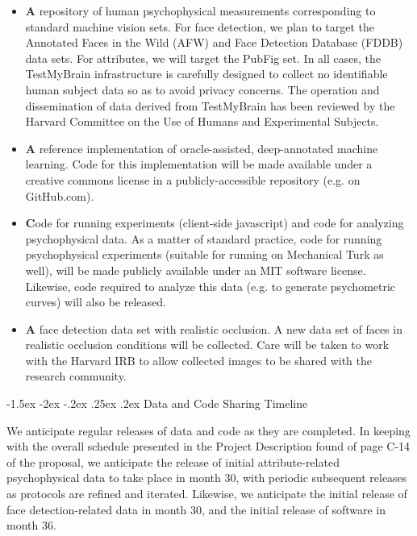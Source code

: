\documentclass{nsfproposal}
\makeatletter
\renewcommand\section{\@startsection {section}{1}{\z@}%
                                   {-1.5ex \@plus -2ex \@minus -.2ex}%
                                   {.25ex \@plus.2ex}%
                                   {\normalfont\Large\bfseries}}
\theoremstyle{definition}
\makeatother
\begin{document}
\begin{itemize}
\item {\textbf A repository of human psychophysical measurements corresponding to standard machine vision sets.}  For face detection, we plan to target the Annotated Faces in the Wild (AFW) and Face Detection Database (FDDB) data sets.  For attributes, we will target the PubFig set.  In all cases, the TestMyBrain infrastructure is carefully designed to collect no identifiable human subject data so as to avoid privacy concerns.  The operation and dissemination of data derived from TestMyBrain has been reviewed by the Harvard Committee on the Use of Humans and Experimental Subjects.

\item {\textbf A reference implementation of oracle-assisted, deep-annotated machine learning.}  Code for this implementation will be made available under a creative commons license in a publicly-accessible repository (e.g. on GitHub.com).

\item {\textbf Code for running experiments (client-side javascript) and code for analyzing psychophysical data.}  As a matter of standard practice, code for running psychophysical experiments (suitable for running on Mechanical Turk as well), will be made publicly available under an MIT software license.  Likewise, code required to analyze this data (e.g. to generate psychometric curves) will also be released.

\item {\textbf A face detection data set with realistic occlusion.}  A new data set of faces in realistic occlusion conditions will be collected.  Care will be taken to work with the Harvard IRB to allow collected images to be shared with the research community.

\end{itemize}

\section{Data and Code Sharing Timeline}

We anticipate regular releases of data and code as they are completed.  In keeping with the overall schedule presented in the Project Description found of page C-14 of the proposal, we anticipate the release of initial attribute-related psychophysical data to take place in month 30, with periodic subsequent releases as protocols are refined and iterated.  
Likewise, we anticipate the initial release of face detection-related data in month 30, and the initial release of software in month 36.
\end{document}
